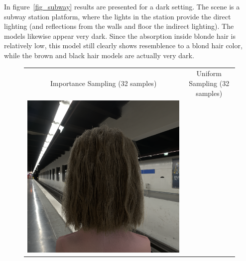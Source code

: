 \documentclass[11pt,a4paper]{report}
\begin{document}
%
%

In figure~\ref{fig_subway} results are presented for a dark setting. The scene is a subway station platform, where the lights in the station provide the direct lighting (and reflections from the walls and floor the indirect lighting). The models likewise appear very dark. Since the absorption inside blonde hair is relatively low, this model still clearly shows resemblence to a blond hair color, while the brown and black hair models are actually very dark.

\begin{figure}[h]
\begin{center}
\begin{tabular}{cc}
Importance Sampling (32 samples) & Uniform Sampling (32 samples) \\
\includegraphics[scale=0.16]{realworld/subway/deon_blonde1_32.png} &

\end{tabular}
\end{center}
\end{figure}
\end{document}

